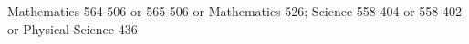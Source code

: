 {Mathematics 564-506 or 565-506 or Mathematics 526; Science 558-404 or 558-402 or Physical Science 436}